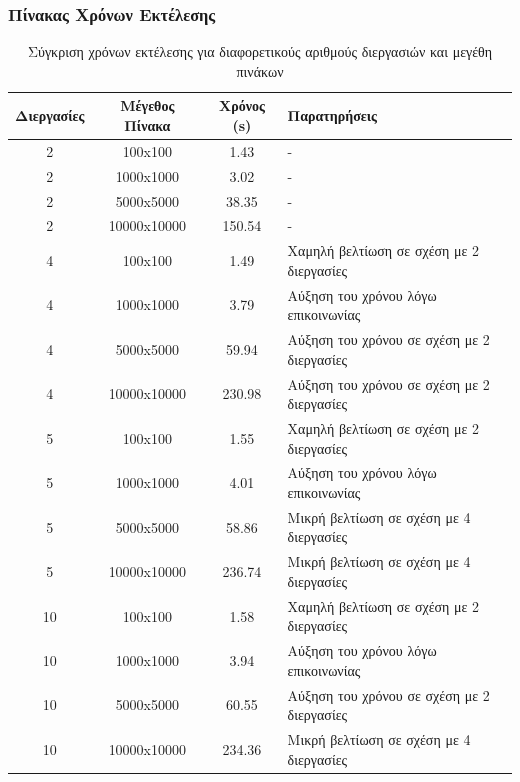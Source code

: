 \documentclass{article}
\begin{document}
\subsubsection*{Πίνακας Χρόνων Εκτέλεσης}
\begin{table}[h]
\centering
\begin{tabularx}{\textwidth}{|c|c|c|X|}
    \hline
    \textbf{Διεργασίες} & \textbf{Μέγεθος Πίνακα} & \textbf{Χρόνος (s)} & \textbf{Παρατηρήσεις} \\
    \hline
    2 & 100x100 & 1.43 & - \\
    2 & 1000x1000 & 3.02 & - \\
    2 & 5000x5000 & 38.35 & - \\
    2 & 10000x10000 & 150.54 & - \\
    \hline
    4 & 100x100 & 1.49 & Χαμηλή βελτίωση σε σχέση με 2 διεργασίες \\
    4 & 1000x1000 & 3.79 & Αύξηση του χρόνου λόγω επικοινωνίας \\
    4 & 5000x5000 & 59.94 & Αύξηση του χρόνου σε σχέση με 2 διεργασίες \\
    4 & 10000x10000 & 230.98 & Αύξηση του χρόνου σε σχέση με 2 διεργασίες \\
    \hline
    5 & 100x100 & 1.55 & Χαμηλή βελτίωση σε σχέση με 2 διεργασίες \\
    5 & 1000x1000 & 4.01 & Αύξηση του χρόνου λόγω επικοινωνίας \\
    5 & 5000x5000 & 58.86 & Μικρή βελτίωση σε σχέση με 4 διεργασίες \\
    5 & 10000x10000 & 236.74 & Μικρή βελτίωση σε σχέση με 4 διεργασίες \\
    \hline
    10 & 100x100 & 1.58 & Χαμηλή βελτίωση σε σχέση με 2 διεργασίες \\
    10 & 1000x1000 & 3.94 & Αύξηση του χρόνου λόγω επικοινωνίας \\
    10 & 5000x5000 & 60.55 & Αύξηση του χρόνου σε σχέση με 2 διεργασίες \\
    10 & 10000x10000 & 234.36 & Μικρή βελτίωση σε σχέση με 4 διεργασίες \\
    \hline
\end{tabularx}
\caption{Σύγκριση χρόνων εκτέλεσης για διαφορετικούς αριθμούς διεργασιών και μεγέθη πινάκων}
\end{table}
\end{document}
